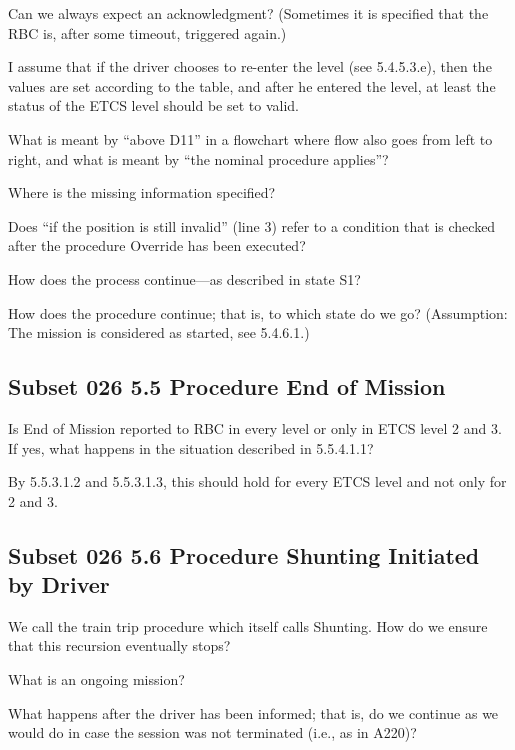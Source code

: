 \documentclass{template/openetcs_article}
\begin{document}
Can we always expect an acknowledgment? (Sometimes it is specified that the RBC is, after some timeout, triggered again.)

I assume that if the driver chooses to re-enter the level (see 5.4.5.3.e), then the values are set according to the table, and after he entered the level, at least the status of the ETCS level should be set to valid.

What is meant by ``above D11'' in a flowchart where flow also goes from left to right, and what is meant by ``the nominal procedure applies''?

Where is the missing information specified?

Does ``if the position is still invalid'' (line 3) refer to a condition that is checked after the procedure Override has been executed?

How does the process continue---as described in state S1?

How does the procedure continue; that is, to which state do we go? (Assumption: The mission is considered as started, see 5.4.6.1.) 


\subsection{Subset 026 5.5 Procedure End of Mission}

Is End of Mission reported to RBC in every level or only in ETCS level 2 and 3. If yes, what happens in the situation described in 5.5.4.1.1?

By 5.5.3.1.2 and 5.5.3.1.3, this should hold for every ETCS level and not only for 2 and 3. 



\subsection{Subset 026 5.6 Procedure Shunting Initiated by Driver}

We call the train trip procedure which itself calls Shunting. How do we ensure that this recursion eventually stops?

What is an ongoing mission?

What happens after the driver has been informed; that is, do we continue as we would do in case the session was not terminated (i.e., as in A220)?
\end{document}
